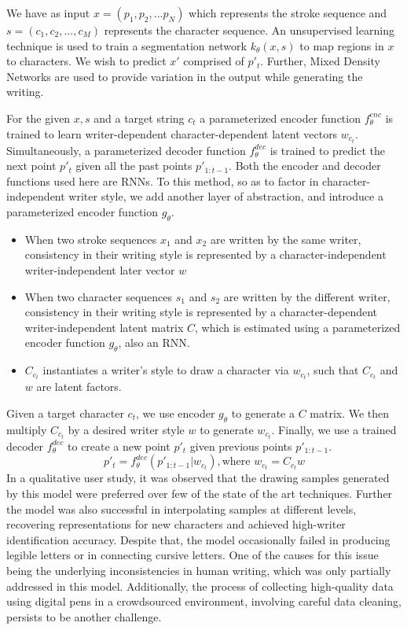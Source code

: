 \documentclass[10pt,twocolumn,letterpaper]{article}
\begin{document}
We have as input $x = (p_1, p_2, ... p_N)$ which represents the stroke sequence and $s = (c_1, c_2, ..., c_M)$ represents the character sequence. An unsupervised learning technique is used to train a segmentation network $k_{\theta}(x,s)$ to map regions in $x$ to characters.
 We wish to predict $x'$ comprised of $p'_t$.  Further, Mixed Density Networks are used to provide variation in the output while generating the writing.

For the given $x, s$ and a target string $c_t$ a parameterized encoder function $f^{enc}_{\theta}$ is trained to learn writer-dependent character-dependent latent vectors $w_{c_t}$. Simultaneously, a parameterized decoder function $f^{dec}_{\theta}$ is trained to predict the next point $p'_t$ given all the past points $p'_{1:t-1}$. Both the encoder and decoder functions used here are RNNs. To this method, so as to factor in character-independent writer style, we add another layer of abstraction, and introduce a parameterized encoder function $g_{\theta}$. 
\begin{itemize}
  \item When two stroke sequences $x_1$ and $x_2$ are written by the same writer, consistency in their writing style is represented by a character-independent writer-independent later vector $w$
  \item When two character sequences $s_1$ and $s_2$ are written by the different writer, consistency in their writing style is represented by a character-dependent writer-independent latent matrix $C$, which is estimated using a parameterized encoder function $g_{\theta}$, also an RNN. 
  \item $C_{c_t}$ instantiates a writer's style to draw a character via $w_{c_t}$, such that $C_{c_t}$ and $w$ are latent factors.
\end{itemize} 

Given a target character $c_t$, we use encoder $g_{\theta}$ to generate a $C$ matrix. We then multiply $C_{c_t}$ by a desired writer style $w$ to generate $w_{c_t}$. Finally, we use a trained decoder $f^{dec}_{\theta}$ to create a new point $p'_t$ given previous points $p'_{1:t-1}$.
\begin{equation*}
  p'_t = f^{dec}_{\theta}(p'_{1:t-1}|w_{c_t}), \text{where } w_{c_t} = C_{c_t}w
\end{equation*}
In a qualitative user study, it was observed that the drawing samples generated by this model were preferred over few of the state of the art techniques. Further the model was also successful in interpolating samples at different levels, recovering representations for new characters and achieved high-writer identification accuracy. Despite that, the model occasionally failed in producing legible letters or in connecting cursive letters. One of the causes for this issue being the underlying inconsistencies in human writing, which was only partially addressed in this model. Additionally, the process of collecting high-quality data using digital pens in a crowdsourced environment, involving careful data cleaning, persists to be another challenge. 
\end{document}
